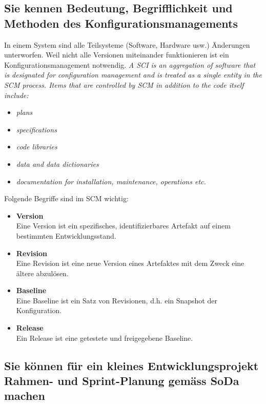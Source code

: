 \subsection{Sie kennen Bedeutung, Begrifflichkeit und Methoden des Konfigurationsmanagements}\label{sec:konfigurationsmanagement}

In einem System sind alle Teilsysteme (Software, Hardware usw.) Änderungen unterworfen. Weil nicht alle Versionen miteinander funktionieren ist ein Konfigurationsmanagement notwendig. \emph{A \ac{SCI} is an aggregation of software that is designated for configuration management and is treated as a single entity in the \ac{SCM} process. Items that are controlled by \ac{SCM} in addition to the code itself include:}

\begin{itemize}
	\item \emph{plans}
	\item \emph{specifications}
	\item \emph{code libraries}
	\item \emph{data and data dictionaries}
	\item \emph{documentation for installation, maintenance, operations etc.}
\end{itemize} 

Folgende Begriffe sind im \ac{SCM} wichtig:

\begin{itemize}
	\item \textbf{Version} \\
		  Eine Version ist ein spezifisches, identifizierbares Artefakt auf einem bestimmten Entwicklungsstand.
	\item \textbf{Revision} \\
		  Eine Revision ist eine neue Version eines Artefaktes mit dem Zweck eine ältere abzulösen.
	\item \textbf{Baseline} \\
		  Eine Baseline ist ein Satz von Revisionen, d.h. ein Snapshot der Konfiguration.
	\item \textbf{Release} \\
		  Ein Release ist eine getestete und freigegebene Baseline.	  
\end{itemize}

\subsection{Sie können für ein kleines Entwicklungsprojekt Rahmen- und Sprint-Planung gemäss SoDa machen}

